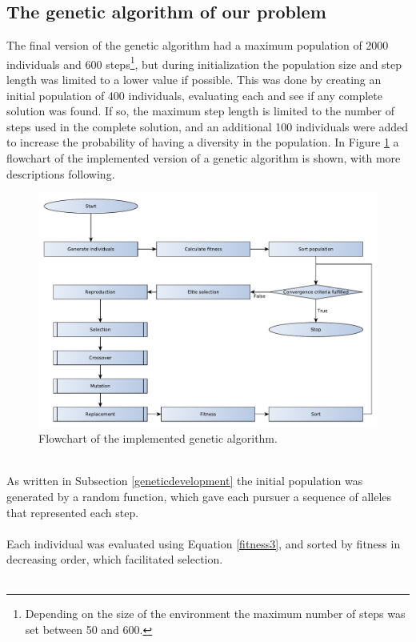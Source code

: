 \subsection{The genetic algorithm of our problem}\label{geneticourproblem}
The final version of the genetic algorithm had a maximum population of 2000 individuals and 600 steps\footnote{Depending on the size of the environment the maximum number of steps was set between 50 and 600.}, but during initialization the population size and step length was limited to a lower value if possible. This was done by creating an initial population of 400 individuals, evaluating each and see if any complete solution was found. If so, the maximum step length is limited to the number of steps used in the complete solution, and an additional 100 individuals were added to increase the probability of having a diversity in the population. In Figure \ref{GeneticFlowChart-algorithm} a flowchart of the implemented version of a genetic algorithm is shown, with more descriptions following.
\begin{figure}[!h]
	\centering
	\includegraphics[width=\textwidth]{chapter_4_methods/GeneticFlowChart-Algorithm}
	\caption[Flowchart of the implemented genetic algorithm]
	{Flowchart of the implemented genetic algorithm.}
	\label{GeneticFlowChart-algorithm}
\end{figure}
\\As written in Subsection \ref{geneticdevelopment} the initial population was generated by a random function, which gave each pursuer a sequence of alleles that represented each step.\\\\
Each individual was evaluated using Equation \eqref{fitness3}, and sorted by fitness in decreasing order, which facilitated selection.\\\\
